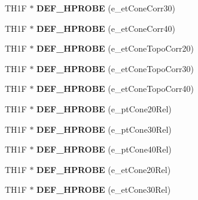 \begin{DoxyCompactItemize}
\item 
\hypertarget{classHistos__Fake_a6d9635d85ac90689f5b9a1951e656b1e}{
TH1F $\ast$ {\bfseries DEF\_\-HPROBE} (e\_\-etConeCorr30)}
\label{classHistos__Fake_a6d9635d85ac90689f5b9a1951e656b1e}

\item 
\hypertarget{classHistos__Fake_a98d467cd15a5b63067fb7e3fc1407ab7}{
TH1F $\ast$ {\bfseries DEF\_\-HPROBE} (e\_\-etConeCorr40)}
\label{classHistos__Fake_a98d467cd15a5b63067fb7e3fc1407ab7}

\item 
\hypertarget{classHistos__Fake_ac6c1e8bfd0ebb99b1b62f2b3083b1cf5}{
TH1F $\ast$ {\bfseries DEF\_\-HPROBE} (e\_\-etConeTopoCorr20)}
\label{classHistos__Fake_ac6c1e8bfd0ebb99b1b62f2b3083b1cf5}

\item 
\hypertarget{classHistos__Fake_adcd3b52fd7e487bd5b42ef07cffd12ab}{
TH1F $\ast$ {\bfseries DEF\_\-HPROBE} (e\_\-etConeTopoCorr30)}
\label{classHistos__Fake_adcd3b52fd7e487bd5b42ef07cffd12ab}

\item 
\hypertarget{classHistos__Fake_a4a78c3d3eb520ad9a34240415ac4d63a}{
TH1F $\ast$ {\bfseries DEF\_\-HPROBE} (e\_\-etConeTopoCorr40)}
\label{classHistos__Fake_a4a78c3d3eb520ad9a34240415ac4d63a}

\item 
\hypertarget{classHistos__Fake_aac0f249b14e90b30978976c6938b1e87}{
TH1F $\ast$ {\bfseries DEF\_\-HPROBE} (e\_\-ptCone20Rel)}
\label{classHistos__Fake_aac0f249b14e90b30978976c6938b1e87}

\item 
\hypertarget{classHistos__Fake_ace7c9f2205189acbbaaf2ae23c727afa}{
TH1F $\ast$ {\bfseries DEF\_\-HPROBE} (e\_\-ptCone30Rel)}
\label{classHistos__Fake_ace7c9f2205189acbbaaf2ae23c727afa}

\item 
\hypertarget{classHistos__Fake_af56b6c9acc8186939e7833d6382330f4}{
TH1F $\ast$ {\bfseries DEF\_\-HPROBE} (e\_\-ptCone40Rel)}
\label{classHistos__Fake_af56b6c9acc8186939e7833d6382330f4}

\item 
\hypertarget{classHistos__Fake_a2d6c3a5260753825fa97e614b1462553}{
TH1F $\ast$ {\bfseries DEF\_\-HPROBE} (e\_\-etCone20Rel)}
\label{classHistos__Fake_a2d6c3a5260753825fa97e614b1462553}

\item 
\hypertarget{classHistos__Fake_aafb718c83bd2d0eb601443d6e708fe61}{
TH1F $\ast$ {\bfseries DEF\_\-HPROBE} (e\_\-etCone30Rel)}
\label{classHistos__Fake_aafb718c83bd2d0eb601443d6e708fe61}


\end{DoxyCompactItemize}
